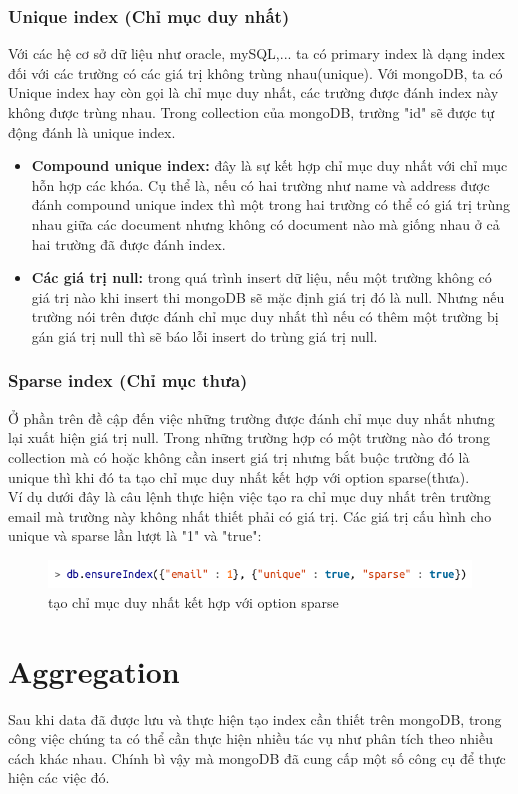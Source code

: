 \subsubsection{Unique index (Chỉ mục duy nhất)}
Với các hệ cơ sở dữ liệu như oracle, mySQL,... ta có primary index là dạng index đối với các trường có các giá trị không trùng nhau(unique). Với mongoDB, ta có Unique index hay còn gọi là chỉ mục duy nhất, các trường được đánh index này không được trùng nhau. Trong collection của mongoDB, trường "id" sẽ được tự động đánh là unique index.
\begin{itemize}
	\item \textbf{Compound unique index: }đây là sự kết hợp chỉ mục duy nhất với chỉ mục hỗn hợp các khóa. Cụ thể là, nếu có hai trường như name và address được đánh compound unique index thì một trong hai trường có thể có giá trị trùng nhau giữa các document nhưng không có document nào mà giống nhau ở cả hai trường đã được đánh index.
	\item \textbf{Các giá trị null: }trong quá trình insert dữ liệu, nếu một trường không có giá trị nào khi insert thi mongoDB sẽ mặc định giá trị đó là null. Nhưng nếu trường nói trên được đánh chỉ mục duy nhất thì nếu có thêm một trường bị gán giá trị null thì sẽ báo lỗi insert do trùng giá trị null.
\end{itemize}
\subsubsection{Sparse index (Chỉ mục thưa)}
Ở phần trên đề cập đến việc những trường được đánh chỉ mục duy nhất nhưng lại xuất hiện giá trị null. Trong những trường hợp có một trường nào đó trong collection mà có hoặc không cần insert giá trị nhưng bắt buộc trường đó là unique thì khi đó ta tạo chỉ mục duy nhất kết hợp với option sparse(thưa).\\
Ví dụ dưới đây là câu lệnh thực hiện việc tạo ra chỉ mục duy nhất trên trường email mà trường này không nhất thiết phải có giá trị. Các giá trị cấu hình cho unique và sparse lần lượt là "1" và "true":
\begin{figure}[h!]
		\centering
		\includegraphics[scale=0.5]{charts/sparse.png}
		\caption{tạo chỉ mục duy nhất kết hợp với option sparse}
		\label{fig:spindex}
\end{figure}

\section{Aggregation}
Sau khi data đã được lưu và thực hiện tạo index cần thiết trên mongoDB, trong công việc chúng ta có thể cần thực hiện nhiều tác vụ như phân tích theo nhiều cách khác nhau. Chính bì vậy mà mongoDB đã cung cấp một số công cụ để thực hiện các việc đó.\\
